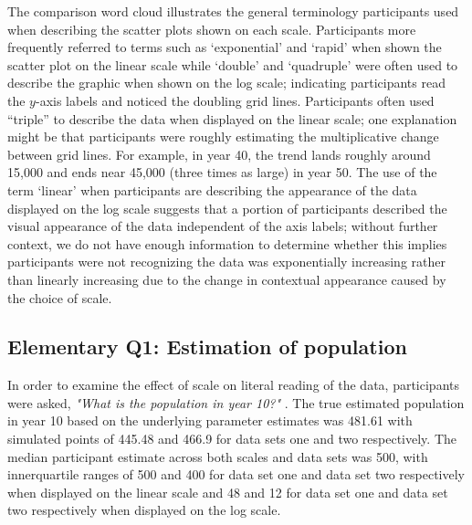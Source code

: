 \documentclass[print]{nuthesis}
\begin{document}
The comparison word cloud illustrates the general terminology participants used when describing the scatter plots shown on each scale.
Participants more frequently referred to terms such as `exponential' and `rapid' when shown the scatter plot on the linear scale while `double' and `quadruple' were often used to describe the graphic when shown on the log scale; indicating participants read the \(y\)-axis labels and noticed the doubling grid lines.
Participants often used ``triple'' to describe the data when displayed on the linear scale; one explanation might be that participants were roughly estimating the multiplicative change between grid lines.
For example, in year 40, the trend lands roughly around 15,000 and ends near 45,000 (three times as large) in year 50.
The use of the term `linear' when participants are describing the appearance of the data displayed on the log scale suggests that a portion of participants described the visual appearance of the data independent of the axis labels; without further context, we do not have enough information to determine whether this implies participants were not recognizing the data was exponentially increasing rather than linearly increasing due to the change in contextual appearance caused by the choice of scale.

\hypertarget{elementary-q1-estimation-of-population}{%
\subsection{Elementary Q1: Estimation of population}\label{elementary-q1-estimation-of-population}}

In order to examine the effect of scale on literal reading of the data, participants were asked, \textit{"What is the population in year 10?"} .
The true estimated population in year 10 based on the underlying parameter estimates was 481.61 with simulated points of 445.48 and 466.9 for data sets one and two respectively.
The median participant estimate across both scales and data sets was 500, with innerquartile ranges of 500 and 400 for data set one and data set two respectively when displayed on the linear scale and 48 and 12 for data set one and data set two respectively when displayed on the log scale.
\end{document}
